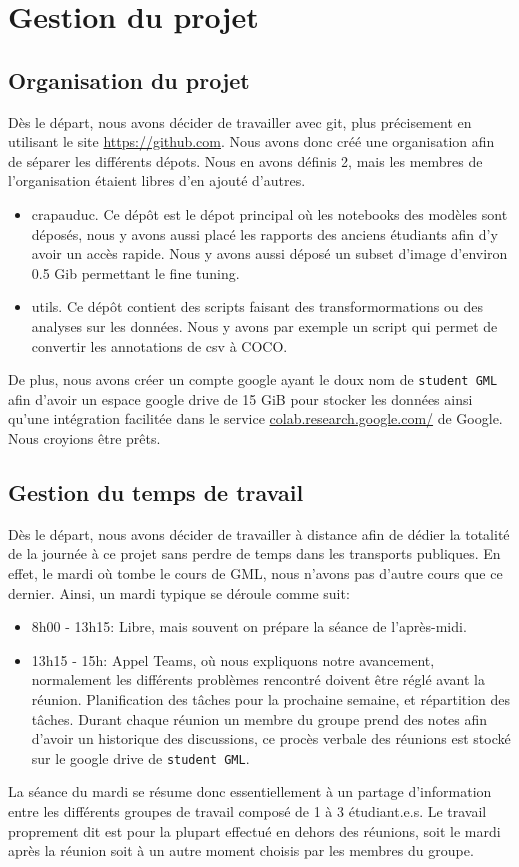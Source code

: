 \chapter{Gestion du projet}
\section{Organisation du projet}
Dès le départ, nous avons décider de travailler avec git, plus précisement 
en utilisant le site \url{https://github.com}. Nous avons donc créé une organisation afin de séparer les différents dépots. Nous en avons définis 2, mais les membres de l'organisation étaient libres d'en ajouté d'autres.
\begin{itemize}
    \item crapauduc.  Ce dépôt est le dépot principal où les notebooks des modèles sont déposés, nous y avons aussi placé les rapports des anciens étudiants afin d'y avoir un accès rapide. Nous y avons aussi déposé un subset d'image d'environ 0.5 Gib permettant le fine tuning.
    \item utils. Ce dépôt contient des scripts faisant des transformormations ou des analyses sur les données. Nous y avons par exemple un script qui permet de convertir les annotations de csv à COCO.
\end{itemize}

De plus, nous avons créer un compte google ayant le doux nom de \verb|student GML| afin d'avoir un espace google drive de 15 GiB pour stocker les données ainsi qu'une intégration facilitée dans le service \url{colab.research.google.com/} de Google. Nous croyions être prêts.


\section{Gestion du temps de travail}
Dès le départ, nous avons décider de travailler à distance afin de dédier 
la totalité de la journée à ce projet sans perdre de temps dans les transports publiques. En effet, le mardi où tombe le cours de GML, nous n'avons pas d'autre cours que ce dernier. Ainsi, un mardi typique se déroule comme suit:
\begin{itemize}
    \item 8h00 - 13h15: Libre, mais souvent on prépare la séance de l'après-midi.
    \item 13h15 - 15h: Appel Teams, où nous expliquons notre avancement, normalement les différents problèmes rencontré doivent être réglé avant la réunion. Planification des tâches pour la prochaine semaine, et répartition des tâches. Durant chaque réunion un membre du groupe prend des notes afin d'avoir un historique des discussions, ce procès verbale des réunions est stocké sur le google drive de \verb|student GML|.
    \label{item:seance}
\end{itemize}
La séance du mardi se résume donc essentiellement à un partage d'information entre les différents groupes de travail composé de 1 à 3 étudiant.e.s. Le travail proprement dit est pour la plupart effectué en dehors des réunions, soit le mardi après la réunion soit à un autre moment choisis par les membres du groupe.


